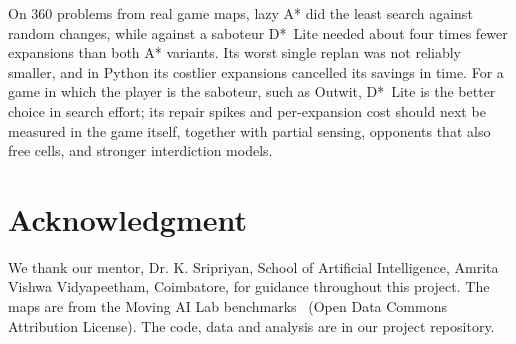 \documentclass[conference,12pt]{IEEEtran}
\newcommand{\dstar}{D*~Lite}
\begin{document}
On 360 problems from real game maps, lazy A* did the least search against random changes, while
against a saboteur \dstar{} needed about four times fewer expansions than both A* variants. Its
worst single replan was not reliably smaller, and in Python its costlier expansions cancelled its
savings in time. For a game in which the player is the saboteur, such as Outwit, \dstar{} is the
better choice in search effort; its repair spikes and per-expansion cost should next be measured
in the game itself, together with partial sensing, opponents that also free cells, and stronger
interdiction models.

\section*{Acknowledgment}
We thank our mentor, Dr. K. Sripriyan, School of Artificial Intelligence, Amrita Vishwa
Vidyapeetham, Coimbatore, for guidance throughout this project. The maps are from the Moving AI
Lab benchmarks~\cite{sturtevant2012benchmarks} (Open Data Commons Attribution License). The code,
data and analysis are in our project repository.



\end{document}
